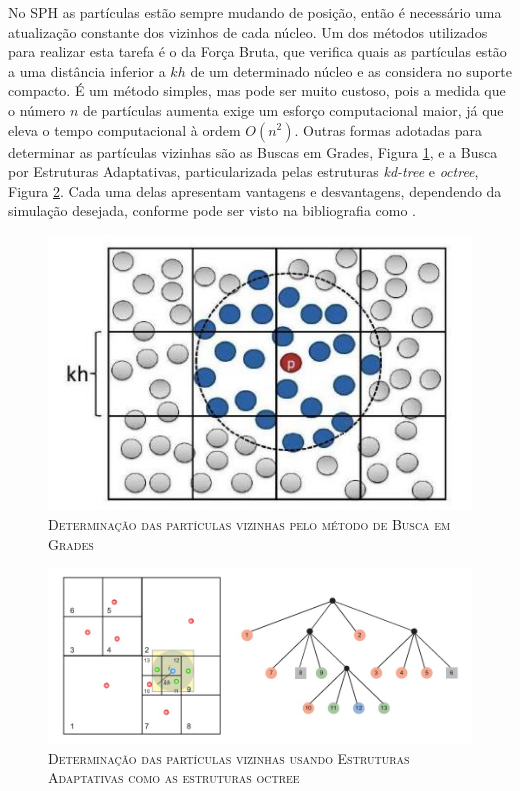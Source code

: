 No SPH as partículas estão sempre mudando de posição, então é necessário uma atualização constante dos vizinhos de cada núcleo. Um dos métodos utilizados para realizar esta tarefa é o da Força Bruta, que verifica quais as partículas estão a uma distância inferior a $kh$ de um determinado núcleo e as considera no suporte compacto. É um método simples, mas pode ser muito custoso, pois a medida que o número $n$ de partículas aumenta exige um esforço computacional maior, já que eleva o tempo computacional à ordem $O(n^2)$. Outras formas adotadas para determinar as partículas vizinhas são as Buscas em Grades, Figura \ref{fig:grade}, e a Busca por Estruturas Adaptativas, particularizada pelas estruturas \textit{kd-tree} e \textit{octree}, Figura \ref{fig:octree}. Cada uma delas apresentam vantagens e desvantagens, dependendo da simulação desejada, conforme pode ser visto na bibliografia como .
\begin{figure}[H]
	\centering
	\includegraphics[scale=1]{figuras/grade.jpg}
	\caption{\textsc{Determinação das partículas vizinhas pelo método de Busca em Grades}}
	\vspace{-0.1cm}
	\label{fig:grade}
\end{figure}
\begin{figure}[H]
	\centering
	\includegraphics[scale=.8]{figuras/octree.jpg}
	\caption{\textsc{Determinação das partículas vizinhas usando Estruturas Adaptativas como as estruturas octree}}
	\vspace{-0.1cm}
	\label{fig:octree}
\end{figure}

